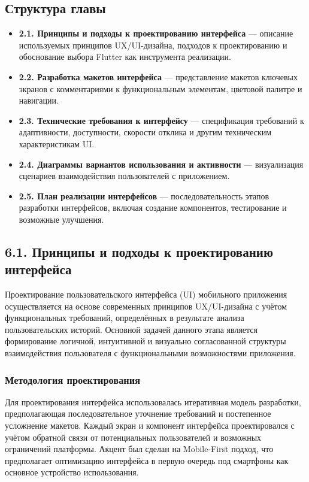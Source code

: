\subsection*{Структура главы}
\begin{itemize}
    \item \textbf{2.1. Принципы и подходы к проектированию интерфейса} — описание используемых принципов UX/UI-дизайна, подходов к проектированию и обоснование выбора Flutter как инструмента реализации.
    \item \textbf{2.2. Разработка макетов интерфейса} — представление макетов ключевых экранов с комментариями к функциональным элементам, цветовой палитре и навигации.
    \item \textbf{2.3. Технические требования к интерфейсу} — спецификация требований к адаптивности, доступности, скорости отклика и другим техническим характеристикам UI.
    \item \textbf{2.4. Диаграммы вариантов использования и активности} — визуализация сценариев взаимодействия пользователей с приложением.
    \item \textbf{2.5. План реализации интерфейсов} — последовательность этапов разработки интерфейсов, включая создание компонентов, тестирование и возможные улучшения.
\end{itemize}

\subsection*{6.1. Принципы и подходы к проектированию интерфейса}
Проектирование пользовательского интерфейса (UI) мобильного приложения осуществляется на основе современных принципов UX/UI-дизайна с учётом функциональных требований, определённых в результате анализа пользовательских историй. Основной задачей данного этапа является формирование логичной, интуитивной и визуально согласованной структуры взаимодействия пользователя с функциональными возможностями приложения.

\subsubsection*{Методология проектирования}
Для проектирования интерфейса использовалась итеративная модель разработки, предполагающая последовательное уточнение требований и постепенное усложнение макетов. Каждый экран и компонент интерфейса проектировался с учётом обратной связи от потенциальных пользователей и возможных ограничений платформы. Акцент был сделан на Mobile-First подход, что предполагает оптимизацию интерфейса в первую очередь под смартфоны как основное устройство использования.

